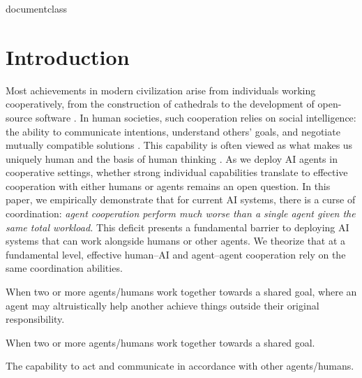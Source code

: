 \csname documentclass

\vspace{-30pt}

\section{Introduction}
\vspace{-5pt}
Most achievements in modern civilization arise from individuals working cooperatively, from the construction of cathedrals to the development of open-source software \citep{raymond1999cathedral,woolley2010evidence}.
In human societies, such cooperation relies on social intelligence: the ability to communicate intentions, understand others' goals, and negotiate mutually compatible solutions \citep{humphrey1976social}. 
This capability is often viewed as what makes us uniquely human and the basis of human thinking \citep{tomasello2014natural}.
As we deploy AI agents in cooperative settings, whether strong individual capabilities translate to effective cooperation with either humans or agents remains an open question.
In this paper, we empirically demonstrate that for current AI systems, there is a curse of coordination: \emph{agent cooperation perform much worse than a single agent given the same total workload.} 
This deficit presents a fundamental barrier to deploying AI systems that can work alongside humans or other agents.
We theorize that at a fundamental level, effective human–AI and agent–agent cooperation rely on the same coordination abilities. 

\begin{tcolorbox}[
  colback=gray!5,
  colframe=gray!50,
  arc=2pt,
  boxrule=0.5pt,
  left=6pt,
  right=6pt,
  top=4pt,
  bottom=4pt,
  title={\small\textbf{Glossary}},
  fonttitle=\sffamily
]
\small
\begin{description}[leftmargin=0pt, labelsep=0.5em, itemsep=2pt]
  \item[Cooperation:] When two or more agents/humans work together towards a shared goal, where an agent may altruistically help another achieve things outside their original responsibility.
  \item[Collaboration:] When two or more agents/humans work together towards a shared goal.
  \item[Coordination:] The capability to act and communicate in accordance with other agents/humans.
\end{description}
\end{tcolorbox}

